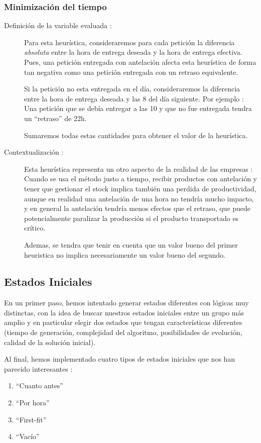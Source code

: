 \documentclass{article}
\begin{document}
\subsubsection{Minimización del tiempo}

\begin{description}
\item[Definición de la variable evaluada :] Para esta heurística, consideraremos
para cada petición la diferencia \emph{absoluta} entre la hora de entrega
deseada y la hora de entrega efectiva. Pues, una petición entregada con
antelación afecta esta heurística de forma tan negativa como una petición
entregada con un retraso equivalente.

Si la petición no esta entregada en el día, consideraremos la diferencia entre
la hora de entrega deseada y las 8 del día siguiente. Por ejemplo : Una petición
que se debía entregar a las 10 y que no fue entregada tendra un ``retraso'' de
22h.

Sumaremos todas estas cantidades para obtener el valor de la heurística.
\item[Contextualización :] Esta heurística representa un otro aspecto de la
realidad de las empresas : Cuando se usa el método justo a tiempo, recibir
productos con antelación y tener que gestionar el stock implica también una
perdida de productividad, aunque en realidad una antelación de una hora no
tendría mucho impacto, y en general la antelación tendría menos efectos que el
retraso, que puede potencialmente paralizar la producción si el producto
transportado es crítico.

Ademas, se tendra que tenir en cuenta que un valor bueno del primer heuristica
no implica necesariamente un valor bueno del segundo.
\end{description}

\subsection{Estados Iniciales}

En un primer paso, hemos intentado generar estados diferentes con lógicas muy
distinctas, con la idea de buscar nuestros estados iniciales entre un grupo más
amplio y en particular elegir dos estados que tengan características diferentes
(tiempo de generación, complejidad del algoritmo, posibilidades de evolución,
calidad de la solución inicial).

Al final, hemos implementado cuatro tipos de estados iniciales que nos han
parecido interesantes :
\begin{enumerate}
\item ``Cuanto antes''
\item ``Por hora''
\item ``First-fit''
\item ``Vacío''
\end{enumerate}
\end{document}
